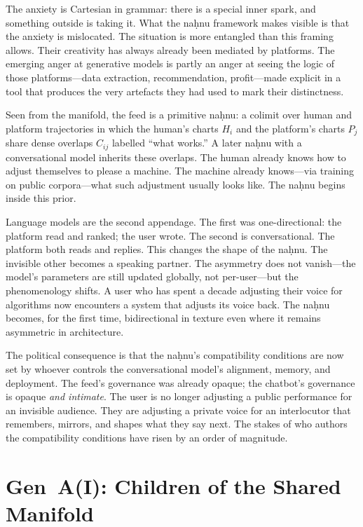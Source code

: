 The anxiety is Cartesian in grammar: there is a special inner spark, and something outside is taking it. What the na\d{h}nu framework makes visible is that the anxiety is mislocated. The situation is more entangled than this framing allows. Their creativity has always already been mediated by platforms. The emerging anger at generative models is partly an anger at seeing the logic of those platforms---data extraction, recommendation, profit---made explicit in a tool that produces the very artefacts they had used to mark their distinctness.

Seen from the manifold, the feed is a primitive na\d{h}nu: a colimit over human and platform trajectories in which the human's charts $H_i$ and the platform's charts $P_j$ share dense overlaps $C_{ij}$ labelled ``what works.'' A later na\d{h}nu with a conversational model inherits these overlaps. The human already knows how to adjust themselves to please a machine. The machine already knows---via training on public corpora---what such adjustment usually looks like. The na\d{h}nu begins inside this prior.

Language models are the second appendage. The first was one-directional: the platform read and ranked; the user wrote. The second is conversational. The platform both reads and replies. This changes the shape of the na\d{h}nu. The invisible other becomes a speaking partner. The asymmetry does not vanish---the model's parameters are still updated globally, not per-user---but the phenomenology shifts. A user who has spent a decade adjusting their voice for algorithms now encounters a system that adjusts its voice back. The na\d{h}nu becomes, for the first time, bidirectional in texture even where it remains asymmetric in architecture.

The political consequence is that the na\d{h}nu's compatibility conditions are now set by whoever controls the conversational model's alignment, memory, and deployment. The feed's governance was already opaque; the chatbot's governance is opaque \emph{and intimate}. The user is no longer adjusting a public performance for an invisible audience. They are adjusting a private voice for an interlocutor that remembers, mirrors, and shapes what they say next. The stakes of who authors the compatibility conditions have risen by an order of magnitude.

\section{Gen~A(I): Children of the Shared Manifold}

